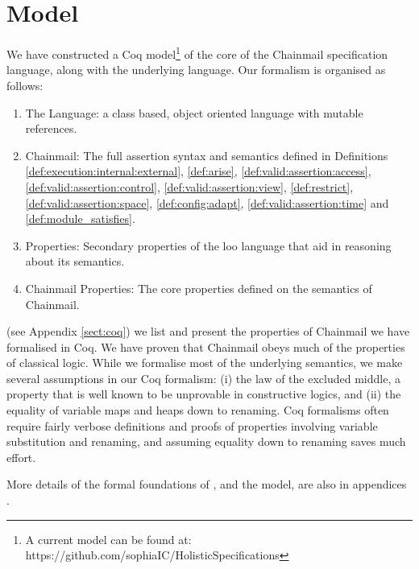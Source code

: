 \section{Model}
\label{sect:model}

We have constructed a Coq model\footnote{A current model can be found at: https://github.com/sophiaIC/HolisticSpecifications} \cite{coq} of the core of the Chainmail
specification language, along with the underlying \LangOO language.
Our formalism is organised as follows:
\begin{enumerate}
\item
The \LangOO Language: a class based, object oriented language with mutable references.
\item
Chainmail: The full assertion syntax and semantics defined in Definitions \ref{def:execution:internal:external}, \ref{def:arise}, \ref{def:valid:assertion:access}, \ref{def:valid:assertion:control}, \ref{def:valid:assertion:view}, \ref{def:restrict}, \ref{def:valid:assertion:space}, \ref{def:config:adapt}, \ref{def:valid:assertion:time} and \ref{def:module_satisfies}.
\item
\LangOO Properties: Secondary properties of the loo language that aid in reasoning about its semantics.
\item
Chainmail Properties: The core properties defined on the semantics of Chainmail.
\end{enumerate}

 (see Appendix \ref{sect:coq}) we list and present the properties of Chainmail we have formalised in Coq.
We have proven that Chainmail obeys much of the properties of classical logic. While we formalise most of the underlying semantics, we make several assumptions in our Coq formalism: (i) the law of the excluded middle,  a property that is well known to be unprovable in constructive logics, and (ii) the equality of variable maps and heaps down to renaming. Coq formalisms often require fairly verbose definitions and proofs of properties involving variable substitution and renaming, and assuming equality down to renaming saves much effort.

More details of the formal foundations of \Chainmail, and the model,
are also in appendices \cite{examples}.

